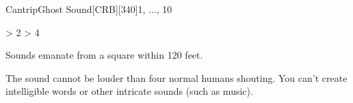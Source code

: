 
\begin{card-collection}{Cantrip}{\level}{Ghost Sound}[CRB][340]{\level}{1, ..., 10}




{%
\def\range{30 feet}
\ifnum \level > 2 
\def\range{60 feet}
\fi
\ifnum \level > 4
\def\range{120 feet}
\fi

Sounds emanate from a square within \range. 

The sound cannot be louder than four normal humans shouting.
You can't create intelligible words or other intricate sounds (such as music).
}
\end{card-collection}%